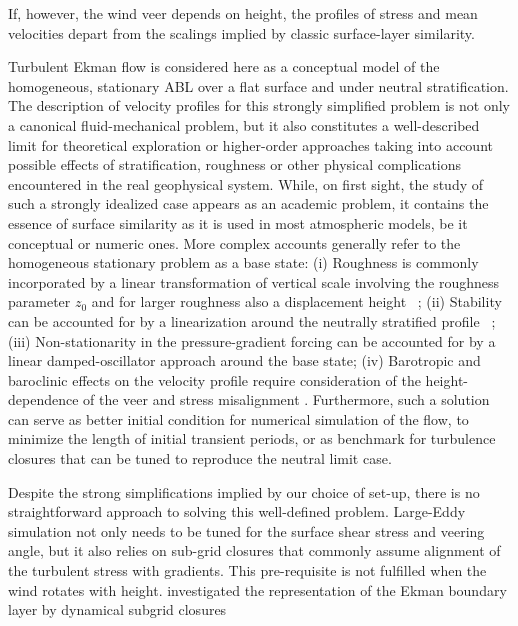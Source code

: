 \documentclass[smallcondensed,final]{svjour3}
\begin{document}
%
If, however, the wind veer depends on height, the profiles of stress and mean velocities depart from the
scalings implied by classic surface-layer similarity.
%
\par
%
Turbulent Ekman flow is considered here as a conceptual model of the
homogeneous, stationary ABL over a flat surface and under neutral stratification. 
%
The description of velocity profiles for this strongly simplified problem is not only a canonical fluid-mechanical problem, but it 
also constitutes a well-described limit for theoretical exploration or higher-order approaches taking into account possible effects of stratification,
roughness or other physical complications encountered in the real geophysical system.
%
While, on first sight, the study of such a strongly idealized case appears as an academic problem, it contains the essence
of surface similarity as it is used in most atmospheric models, be it conceptual or numeric ones.
%
More complex accounts generally refer to the homogeneous stationary problem as a base state: 
%
(i) Roughness is commonly incorporated by a linear transformation of vertical scale involving the
roughness parameter $z_0$ and for larger roughness also a displacement height~%
\citep{monin:1975,jacobs:AFM1988,hogstrom:BM1988};
%
(ii) Stability can be accounted for by a linearization around the neutrally stratified profile~%
\citep{monin:ARF1970, monin:1975, hogstrom:BM1988, hogstrom:BM1996,sakagami:BM2020};
%
(iii) Non-stationarity in the pressure-gradient forcing can be accounted for by a linear damped-oscillator
approach around the base state\citep{momen:JAS2016}; 
%
(iv) Barotropic and baroclinic effects on the velocity profile require consideration of
the height-dependence of the veer and stress misalignment \citep{momen:JAS2018, ghannam:QJR2021}.
% 
Furthermore, such a solution can serve as better initial condition for numerical simulation of the flow,
to minimize the length of initial transient periods, or as benchmark for turbulence
closures that can be tuned to reproduce the neutral limit case.
%
\par
%
Despite the strong simplifications implied by our choice of set-up, there is no straightforward approach to solving
this well-defined problem.
%
Large-Eddy simulation not only needs to be tuned for the surface shear stress and veering angle, but it also
relies on sub-grid closures that commonly assume alignment of the turbulent stress with gradients.
%
This pre-requisite is not fulfilled when the wind rotates with height.
%
\citet{esau:EFM2004} investigated the representation of the Ekman boundary layer by dynamical subgrid closures
\end{document}
